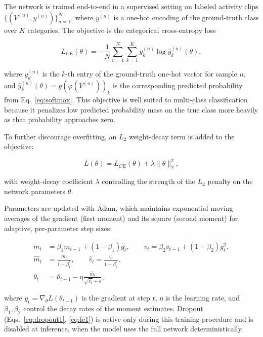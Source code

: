\documentclass[11pt,a4paper]{article}
\begin{document}
    The network is trained end-to-end in a supervised setting on labeled activity clips $\{(V^{(n)}, y^{(n)})\}_{n=1}^{N}$, where $y^{(n)}$ is a one-hot encoding of the ground-truth class over $K$ categories. The objective is the categorical cross-entropy loss

    \begin{equation}
        L_{CE}(\theta) = -\frac{1}{N} \sum_{n=1}^{N} \sum_{k=1}^{K} y_k^{(n)} \log \hat{y}_k^{(n)}(\theta),
        \label{eq:crossentropy}
    \end{equation}

    where $y_k^{(n)}$ is the $k$-th entry of the ground-truth one-hot vector for sample $n$, and $\hat{y}_k^{(n)}(\theta) = g(\varphi(V^{(n)}))_k$ is the corresponding predicted probability from Eq.~\eqref{eq:softmax}. This objective is well suited to multi-class classification because it penalizes low predicted probability mass on the true class more heavily as that probability approaches zero.

    To further discourage overfitting, an $L_2$ weight-decay term is added to the objective:

    \begin{equation}
        L(\theta) = L_{CE}(\theta) + \lambda \lVert \theta \rVert_2^2,
        \label{eq:regularized}
    \end{equation}

    with weight-decay coefficient $\lambda$ controlling the strength of the $L_2$ penalty on the network parameters $\theta$.

    Parameters are updated with Adam, which maintains exponential moving averages of the gradient (first moment) and its square (second moment) for adaptive, per-parameter step sizes:

    \begin{align}
        m_t &= \beta_1 m_{t-1} + (1-\beta_1) g_t, \qquad
        v_t = \beta_2 v_{t-1} + (1-\beta_2) g_t^2, \label{eq:adam1} \\
        \hat{m}_t &= \frac{m_t}{1-\beta_1^{t}}, \qquad
        \hat{v}_t = \frac{v_t}{1-\beta_2^{t}}, \label{eq:adam2} \\
        \theta_t &= \theta_{t-1} - \eta \frac{\hat{m}_t}{\sqrt{\hat{v}_t} + \varepsilon}, \label{eq:adam3}
    \end{align}

    where $g_t = \nabla_\theta L(\theta_{t-1})$ is the gradient at step $t$, $\eta$ is the learning rate, and $\beta_1, \beta_2$ control the decay rates of the moment estimates. Dropout (Eqs.~\eqref{eq:dropout1}, \eqref{eq:fc1}) is active only during this training procedure and is disabled at inference, when the model uses the full network deterministically.
\end{document}
